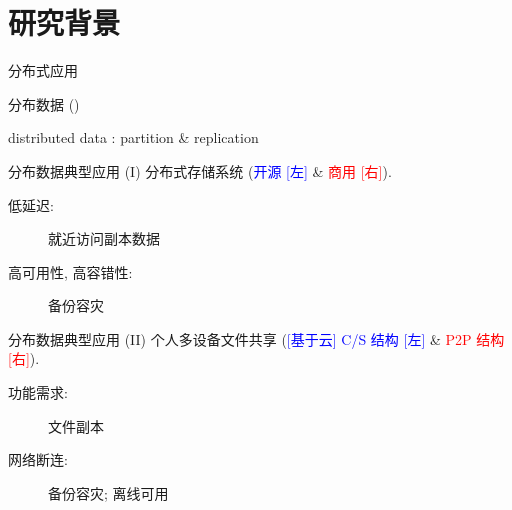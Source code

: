 \section{研究背景}

\begin{frame}{分布式应用}


\end{frame}
\begin{frame}{分布数据}
  ()


  \begin{center}
    {\Large distributed data : partition \& replication}
  \end{center}

\end{frame}
\begin{frame}{分布数据典型应用 (I)}
  {分布式存储系统 (\textcolor{blue}{\scriptsize 开源 [左]} \& \textcolor{red}{\scriptsize 商用 [右]}).}

  \begin{description}
    \item[低延迟:] 就近访问副本数据
    \item[高可用性, 高容错性:] 备份容灾 
  \end{description}
\end{frame}
\begin{frame}{分布数据典型应用 (II)}
  {个人多设备文件共享 {(\textcolor{blue}{\scriptsize [基于云] C/S 结构 [左]} \& 
  \textcolor{red}{\scriptsize P2P 结构 [右]}).}}

  \begin{description}
    \item[功能需求:] 文件副本 
    \item[网络断连:] 备份容灾; 离线可用
  \end{description}
\end{frame}
